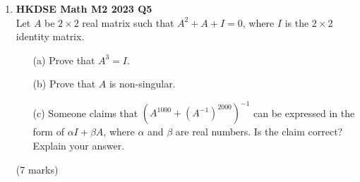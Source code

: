 \documentclass{report}
\begin{document}
\begin{enumerate}
	\item \textbf{HKDSE Math M2 2023 Q5}\\
	Let $A$ be $2\times2$ real matrix such that $A^2 + A + I = 0$, where $I$ is the $2\times2$ identity matrix. 
	\begin{enumerate}
		\item [(a)]Prove that $A^3 = I$.
		\item [(b)]Prove that $A$ is non-singular.
		\item [(c)]Someone claims that $\left(A^{1000} + (A^{-1})^{2000}\right)^{-1}$ can be expressed in the form of $\alpha I + \beta A$, where $\alpha$ and $\beta$ are real numbers. Is the claim correct? Explain your answer.
	\end{enumerate}
	(7 marks)

\end{enumerate}
\end{document}
